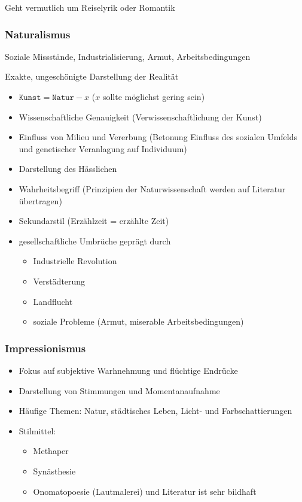 Geht vermutlich um Reiselyrik oder Romantik

\subsubsection{Naturalismus}

 Soziale Missstände, Industrialisierung, Armut, Arbeitsbedingungen

 Exakte, ungeschönigte Darstellung der Realität

\begin{itemize}
    \item $\texttt{Kunst} = \texttt{Natur} - x$ ($x$ sollte möglichst gering sein)
    \item Wissenschaftliche Genauigkeit (Verwissenschaftlichung der Kunst)
    \item Einfluss von Milieu und Vererbung (Betonung Einfluss des sozialen Umfelds und genetischer Veranlagung auf Individuum)
    \item Darstellung des Hässlichen
    \item Wahrheitsbegriff (Prinzipien der Naturwissenschaft werden auf Literatur übertragen)
    \item Sekundarstil (Erzählzeit = erzählte Zeit)
\end{itemize}

\begin{itemize}
    \item gesellschaftliche Umbrüche geprägt durch 
    \begin{itemize}
        \item Industrielle Revolution
        \item Verstädterung
        \item Landflucht
        \item soziale Probleme (Armut, miserable Arbeitsbedingungen)
    \end{itemize}
\end{itemize}


\subsubsection{Impressionismus}
\begin{itemize}
    \item Fokus auf subjektive Warhnehmung und flüchtige Endrücke
    \item Darstellung von Stimmungen und Momentanaufnahme
    \item Häufige Themen: Natur, städtisches Leben, Licht- und Farbschattierungen
    \item Stilmittel:
    \begin{itemize}
        \item Methaper
        \item Synästhesie
        \item Onomatopoesie (Lautmalerei) und Literatur ist sehr bildhaft
    \end{itemize}
\end{itemize}


